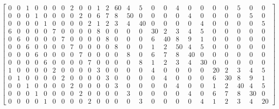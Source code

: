\documentclass[10pt]{book}
\begin{document}
\begin{mdSnippets}
\begin{mdDisplaySnippet}[9fef68a6d78f4fb0a3e0153523e84f1a]
\begin{mdDiv}[class={mathdisplay,math-display},color={},math-needpdf={}]
\[\begin{bmatrix}
0  & 0  & 1  & 0  & 0  & 0  & 0  & 2  & 0  & 0  & 1  & 2  & 60 &  4 &  5 &  0 &  0 &  4 &  0 &  0 &  0 &  0 &  5 &  0 &  0 \\
0  & 0  & 0  & 1  & 0  & 0  & 0  & 0  & 2  & 0  & 6  & 7  & 8  & 50 &  0 &  0 &  0 &  0 &  4 &  0 &  0 &  0 &  0 &  5 &  0 \\
0  & 0  & 0  & 0  & 1  & 0  & 0  & 0  & 0  & 2  & 1  & 2  & 3  & 4  & 40 &  0 &  0 &  0 &  0 &  4 &  0 &  0 &  0 &  0 &  5 \\
6  & 0  & 0  & 0  & 0  & 7  & 0  & 0  & 0  & 0  & 8  & 0  & 0  & 0  & 0  & 30 &  2 &  3 &  4 &  5 &  0 &  0 &  0 &  0 &  0 \\
0  & 6  & 0  & 0  & 0  & 0  & 7  & 0  & 0  & 0  & 0  & 8  & 0  & 0  & 0  & 6  & 40 &  8 &  9 &  1 &  0 &  0 &  0 &  0 &  0 \\
0  & 0  & 6  & 0  & 0  & 0  & 0  & 7  & 0  & 0  & 0  & 0  & 8  & 0  & 0  & 1  & 2  & 50 &  4 &  5 &  0 &  0 &  0 &  0 &  0 \\
0  & 0  & 0  & 6  & 0  & 0  & 0  & 0  & 7  & 0  & 0  & 0  & 0  & 8  & 0  & 6  & 7  & 8  & 40 &  0 &  0 &  0 &  0 &  0 &  0 \\
0  & 0  & 0  & 0  & 6  & 0  & 0  & 0  & 0  & 7  & 0  & 0  & 0  & 0  & 8  & 1  & 2  & 3  & 4  & 30 &  0 &  0 &  0 &  0 &  0 \\
1  & 0  & 0  & 0  & 0  & 2  & 0  & 0  & 0  & 0  & 3  & 0  & 0  & 0  & 0  & 4  & 0  & 0  & 0  & 0  & 20 &  2 &  3 &  4 &  5 \\
0  & 1  & 0  & 0  & 0  & 0  & 2  & 0  & 0  & 0  & 0  & 3  & 0  & 0  & 0  & 0  & 4  & 0  & 0  & 0  & 6  & 30 &  8 &  9 &  1 \\
0  & 0  & 1  & 0  & 0  & 0  & 0  & 2  & 0  & 0  & 0  & 0  & 3  & 0  & 0  & 0  & 0  & 4  & 0  & 0  & 1  & 2  & 40 &  4 &  5 \\
0  & 0  & 0  & 1  & 0  & 0  & 0  & 0  & 2  & 0  & 0  & 0  & 0  & 3  & 0  & 0  & 0  & 0  & 4  & 0  & 6  & 7  & 8  & 30 &  0 \\
0  & 0  & 0  & 0  & 1  & 0  & 0  & 0  & 0  & 2  & 0  & 0  & 0  & 0  & 3  & 0  & 0  & 0  & 0  & 4  & 1  & 2  & 3  & 4  & 20
\end{bmatrix}
\]%
\end{mdDiv}%

\end{mdDisplaySnippet}%

\end{mdSnippets}
\end{document}
